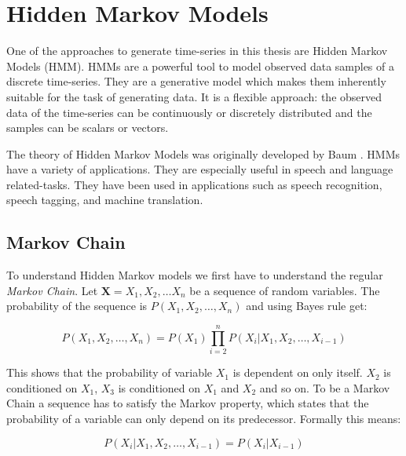
\chapter{Hidden Markov Models}\label{chapter:hmm}

One of the approaches to generate time-series in this thesis are Hidden Markov Models (HMM). HMMs are a powerful tool to model observed data samples of a discrete time-series. They are a generative model which makes them inherently suitable for the task of generating data. It is a flexible approach: the observed data of the time-series can be continuously or discretely distributed and the samples can be scalars or vectors. 

The theory of Hidden Markov Models was originally developed by Baum \parencite{baum1972inequality}. HMMs have a variety of applications. They are especially useful in speech and language related-tasks. They have been used in applications such as speech recognition, speech tagging, and machine translation\parencite{huang2001spoken}.

\section{Markov Chain}
To understand Hidden Markov models we first have to understand the regular \emph{Markov Chain}. Let $\mathbf{X}=X_{1}, X_{2}, \ldots X_{n}$ be a sequence of random variables. The probability of the sequence is $P\left(X_{1}, X_{2}, \ldots, X_{n}\right)$ and using Bayes rule get: 

\begin{equation}
P\left(X_{1}, X_{2}, \ldots, X_{n}\right)=P\left(X_{1}\right) \prod_{i=2}^{n} P\left(X_{i} |X_{1}, X_{2}, \ldots, X_{i-1}\right)
\end{equation}

This shows that the probability of variable $X_1$ is dependent on only itself. $X_2$ is conditioned on $X_1$, $X_3$ is conditioned on $X_1$ and $X_2$ and so on. To be a Markov Chain a sequence has to satisfy the Markov property, which states that the probability of a variable can only depend on its predecessor. Formally this means: 

\begin{equation}
P\left(X_{i} | X_{1}, X_{2}, \ldots, X_{i-1}\right)=P\left(X_{i} | X_{i-1}\right)
\end{equation}


